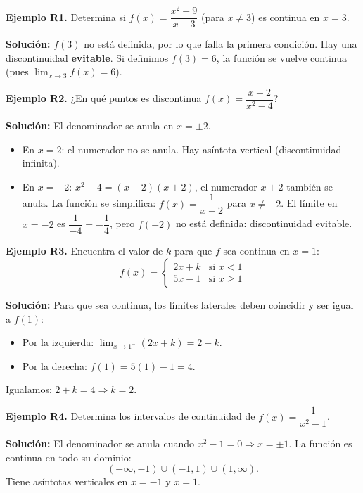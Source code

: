 \documentclass[12pt, letterpaper]{article}
\begin{document}
\textbf{Ejemplo R1.} Determina si $f(x) = \dfrac{x^2 - 9}{x - 3}$ (para $x \neq 3$) es continua en $x = 3$.

\begin{cuadrosolucion}
  \textbf{Solución:} $f(3)$ no está definida, por lo que falla la primera condición. Hay una discontinuidad \textbf{evitable}. Si definimos $f(3) = 6$, la función se vuelve continua (pues $\lim_{x \to 3} f(x) = 6$).
\end{cuadrosolucion}
\newpage
\textbf{Ejemplo R2.} ¿En qué puntos es discontinua $f(x) = \dfrac{x + 2}{x^2 - 4}$?

\begin{cuadrosolucion}
  \textbf{Solución:} El denominador se anula en $x = \pm 2$.
  \begin{itemize}
    \item En $x = 2$: el numerador no se anula. Hay asíntota vertical (discontinuidad infinita).
    \item En $x = -2$: $x^2 - 4 = (x - 2)(x + 2)$, el numerador $x + 2$ también se anula. La función se simplifica: $f(x) = \dfrac{1}{x - 2}$ para $x \neq -2$. El límite en $x = -2$ es $\dfrac{1}{-4} = -\dfrac{1}{4}$, pero $f(-2)$ no está definida: discontinuidad evitable.
  \end{itemize}
\end{cuadrosolucion}

\textbf{Ejemplo R3.} Encuentra el valor de $k$ para que $f$ sea continua en $x = 1$:
$$f(x) = \begin{cases} 2x + k & \text{si } x < 1 \\ 5x - 1 & \text{si } x \ge 1 \end{cases}$$

\begin{cuadrosolucion}
  \textbf{Solución:} Para que sea continua, los límites laterales deben coincidir y ser igual a $f(1)$:
  \begin{itemize}
    \item Por la izquierda: $\lim_{x \to 1^-} (2x + k) = 2 + k$.
    \item Por la derecha: $f(1) = 5(1) - 1 = 4$.
  \end{itemize}
  Igualamos: $2 + k = 4 \Rightarrow k = 2$.
\end{cuadrosolucion}

\textbf{Ejemplo R4.} Determina los intervalos de continuidad de $f(x) = \dfrac{1}{x^2 - 1}$.

\begin{cuadrosolucion}
  \textbf{Solución:} El denominador se anula cuando $x^2 - 1 = 0 \Rightarrow x = \pm 1$. La función es continua en todo su dominio:
  $$(-\infty, -1) \cup (-1, 1) \cup (1, \infty).$$
  Tiene asíntotas verticales en $x = -1$ y $x = 1$.
\end{cuadrosolucion}
\end{document}
